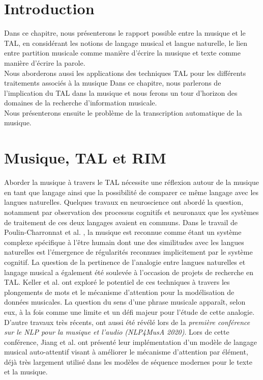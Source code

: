 \section{Introduction}
Dans ce chapitre, nous présenterons le rapport possible entre la musique et le TAL, en considérant les notions de langage musical et langue naturelle, le lien entre partition musicale comme manière d’écrire la musique et texte comme manière d’écrire la parole.\\
Nous aborderons aussi les applications des techniques TAL pour les différents traitements associés à la musique
Dans ce chapitre, nous parlerons de l’implication du TAL dans la musique et nous ferons un tour d’horizon des domaines de la recherche d’information musicale.\\ Nous présenterons ensuite le problème de la transcription automatique de la musique.
\section{Musique, TAL et RIM}
Aborder la musique à travers le TAL nécessite une réflexion autour de la musique en tant que langage ainsi que la possibilité de comparer ce même langage avec les langues naturelles. Quelques travaux en neuroscience ont abordé la question, notamment par observation des processus cognitifs et neuronaux que les systèmes de traitement de ces deux langages avaient en communs. Dans le travail de Poulin-Charronnat et al. \cite{poulincharronnat:hal-01985213}, la musique est reconnue comme étant un système complexe spécifique à l’être humain dont une des similitudes avec les langues naturelles est l’émergence de régularités reconnues implicitement par le système cognitif. La question de la pertinence de l’analogie entre langues naturelles et langage musical a également été soulevée à l’occasion de projets de recherche en TAL. Keller et al. \cite{keller:hal-03279850} ont exploré le potentiel de ces techniques à travers les plongements de mots et le mécanisme d’attention pour la modélisation de données musicales. La question du sens d’une phrase musicale apparaît, selon eux, à la fois comme une limite et un défi majeur pour l’étude de cette analogie.\\
D’autre travaux très récents, ont aussi été révélé lors de la \textit{première conférence sur le NLP pour la musique et l'audio (NLP4MusA 2020)}. Lors de cette conférence, Jiang et al. \cite{Jiang2020DiscoveringMR} ont présenté leur implémentation d’un modèle de langage musical auto-attentif visant à améliorer le mécanisme d'attention par élément, déjà très largement utilisé dans les modèles de séquence modernes pour le texte et la musique.
